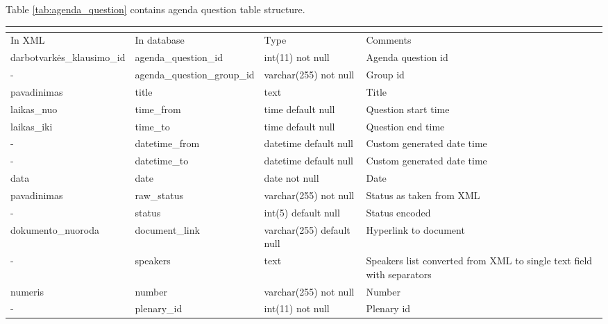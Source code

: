 \documentclass[a4paper,12pt]{article}
\begin{document}
	\noindent
	Table \ref{tab:agenda_question} contains agenda question table structure.
	\begin{center}
		\begin{tabular}{L{3cm} L{4.2cm} L{3cm} L{2.5cm}}
			\\ 
			\hline
			In XML & In database & Type & Comments\\
			\hline
			darbotvarkės\_klausimo\_id & agenda\_question\_id & int(11) not null & Agenda question id\\
			- & agenda\_question\_group\_id & varchar(255) not null & Group id\\
			pavadinimas & title & text & Title \\
			laikas\_nuo & time\_from & time default null &  Question start time \\
			laikas\_iki & time\_to & time default null & Question end time \\
			- & datetime\_from & datetime default null & Custom generated date time \\
			- & datetime\_to & datetime default null & Custom generated date time\\
			data & date &  date not null & Date\\
			pavadinimas & raw\_status & varchar(255) not null & Status as taken from XML \\
			- & status & int(5) default null & Status encoded \\
			dokumento\_nuoroda & document\_link & varchar(255) default null & Hyperlink to document\\
			- & speakers & text & Speakers list converted from XML to single text field with separators \\
			numeris & number & varchar(255) not null & Number \\
			- & plenary\_id & int(11) not null & Plenary id\\			                                    
			\hline
		\end{tabular}
		 \label{tab:agenda_question}
	\end{center}
	
	\hfill
	
\end{document}
